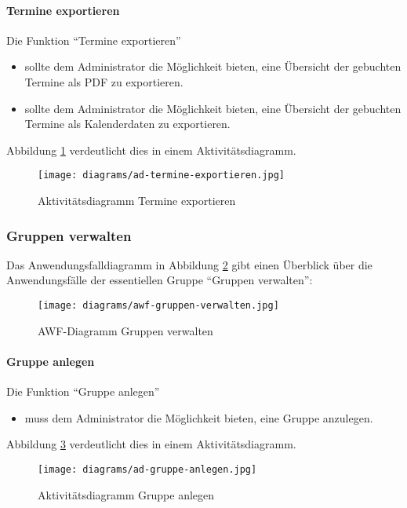 \paragraph{Termine exportieren}

Die Funktion ``Termine exportieren''
\begin{itemize}
  \item sollte dem Administrator die Möglichkeit bieten, eine Übersicht der gebuchten Termine als PDF zu exportieren.
  \item sollte dem Administrator die Möglichkeit bieten, eine Übersicht der gebuchten Termine als Kalenderdaten zu exportieren.
\end{itemize}

Abbildung \ref{fig:ad-termine-exportieren} verdeutlicht dies in einem Aktivitätsdiagramm.

\begin{figure}
  \centering
  \texttt{[image: diagrams/ad-termine-exportieren.jpg]}
  \caption{Aktivitätsdiagramm Termine exportieren}
  \label{fig:ad-termine-exportieren}
\end{figure}

\subsubsection{Gruppen verwalten}

Das Anwendungsfalldiagramm in Abbildung \ref{fig:awf-gruppen-verwalten} gibt einen Überblick über die
Anwendungsfälle der essentiellen Gruppe ``Gruppen verwalten'':

\begin{figure}
  \centering
  \texttt{[image: diagrams/awf-gruppen-verwalten.jpg]}
  \caption{AWF-Diagramm Gruppen verwalten}
  \label{fig:awf-gruppen-verwalten}
\end{figure}

\paragraph{Gruppe anlegen}

Die Funktion ``Gruppe anlegen''
\begin{itemize}
  \item muss dem Administrator die Möglichkeit bieten, eine Gruppe anzulegen.
\end{itemize}

Abbildung \ref{fig:ad-gruppe-anlegen} verdeutlicht dies in einem Aktivitätsdiagramm.

\begin{figure}
  \centering
  \texttt{[image: diagrams/ad-gruppe-anlegen.jpg]}
  \caption{Aktivitätsdiagramm Gruppe anlegen}
  \label{fig:ad-gruppe-anlegen}
\end{figure}

